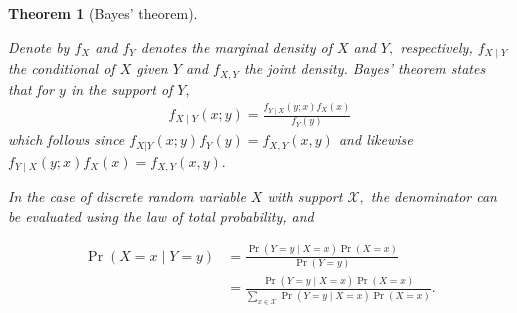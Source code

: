 \documentclass[
  11pt,
  letterpaper,
]{scrbook}
\theoremstyle{definition}
\theoremstyle{plain}
\newtheorem{theorem}{Theorem}[chapter]
\theoremstyle{plain}
\theoremstyle{definition}
\theoremstyle{definition}
\theoremstyle{remark}
\begin{document}
\begin{theorem}[Bayes'
theorem]\protect\hypertarget{thm-Bayes}{}\label{thm-Bayes}

Denote by \(f_X\) and \(f_Y\) denotes the marginal density of \(X\) and
\(Y,\) respectively, \(f_{X \mid Y}\) the conditional of \(X\) given
\(Y\) and \(f_{X,Y}\) the joint density. Bayes' theorem states that for
\(y\) in the support of \(Y,\) \begin{align*}
f_{X\mid Y}(x; y) = \frac{f_{Y\mid X}(y; x)f_X(x)}{f_Y(y)}
\end{align*} which follows since \(f_{X|Y}(x; y)f_Y(y) = f_{X,Y}(x,y)\)
and likewise \(f_{Y \mid X}(y; x)f_X(x) = f_{X,Y}(x,y).\)

In the case of discrete random variable \(X\) with support
\(\mathcal{X},\) the denominator can be evaluated using the law of total
probability, and

\begin{align*}
\Pr(X = x \mid Y=y) &= \frac{\Pr(Y=y \mid X=x)\Pr(X=x)}{\Pr(Y=y)} \\&= \frac{\Pr(Y=y \mid X=x)\Pr(X=x)}{\sum_{x \in \mathcal{X}}\Pr(Y =y \mid X=x)\Pr(X=x)}.
\end{align*}

\end{theorem}
\end{document}

